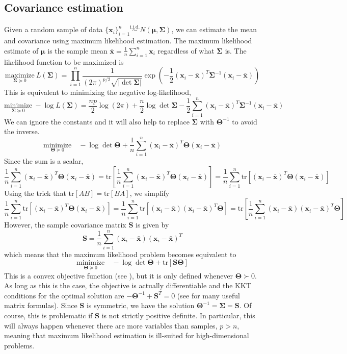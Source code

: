 \documentclass[10pt, letterpaper]{article}
\newcommand{\bx}{\boldsymbol x} %
\newcommand{\cov}{\boldsymbol \Sigma}
\newcommand{\preci}{\boldsymbol \Theta}
\newcommand{\mean}{\boldsymbol \mu}
\newcommand{\iid}{\stackrel{\mathrm{i.i.d.}}{\sim}}
\newcommand{\tr}[1]{\mathrm{tr}\left[  #1 \right]}
\newcommand{\sampcov}{\boldsymbol S} %
\begin{document}
\subsection{Covariance estimation}

Given a random sample of data $\{ \bx_i \}_{i=1}^n \iid N(\mean, \cov)$, we can estimate the mean and covariance using maximum likelihood estimation.  The maximum likelihood estimate of $\mean$ is the sample mean $\bar{\bx} = \frac{1}{n}\sum_{i=1}^n \bx_i$ regardless of what $\cov$ is.  The likelihood function to be maximized is
\[
\underset{\cov \succeq 0}{\mathrm{maximize}}\  L(\cov) = \prod_{i=1}^n \frac{1}{(2\pi)^{p/2} \sqrt{|\det \cov| }} \exp\left( -\frac{1}{2}(\bx_i - \bar{\bx})^T \cov^{-1}(\bx_i - \bar{\bx})  \right)
\]
This is equivalent to minimizing the negative log-likelihood,
\[
\underset{\cov \succeq 0}{\mathrm{minimize}}\  - \log L(\cov) = \frac{np}{2} \log(2\pi) + \frac{n}{2} \log \det \cov - \frac{1}{2} \sum_{i=1}^n (\bx_i - \bar{\bx})^T \cov^{-1}(\bx_i - \bar{\bx})
\]
We can ignore the constants and it will also help to replace $\cov$ with $\preci^{-1}$ to avoid the inverse.
\[
\underset{\preci \succeq 0}{\mathrm{minimize}}\quad   -\log \det \preci +  \frac{1}{n}\sum_{i=1}^n (\bx_i - \bar{\bx})^T \preci (\bx_i - \bar{\bx})
\]
Since the sum is a scalar,
\[
\frac{1}{n}\sum_{i=1}^n (\bx_i - \bar{\bx})^T \preci (\bx_i - \bar{\bx}) = \tr{\frac{1}{n}\sum_{i=1}^n (\bx_i - \bar{\bx})^T \preci (\bx_i - \bar{\bx})} = \frac{1}{n}\sum_{i=1}^n \tr{  (\bx_i - \bar{\bx})^T \preci (\bx_i - \bar{\bx})}
\]
Using the trick that $\tr{AB} = \tr{BA}$, we simplify
\[
\frac{1}{n}\sum_{i=1}^n \tr{  (\bx_i - \bar{\bx})^T \preci (\bx_i - \bar{\bx})} = \frac{1}{n}\sum_{i=1}^n \tr{  (\bx_i - \bar{\bx})(\bx_i - \bar{\bx})^T \preci } = \tr{\frac{1}{n}\sum_{i=1}^n (\bx_i - \bar{\bx})(\bx_i - \bar{\bx})^T \preci  }
\]
However, the sample covariance matrix $\sampcov$ is given by
\[
\sampcov =  \frac{1}{n}\sum_{i=1}^n (\bx_i - \bar{\bx})(\bx_i - \bar{\bx})^T
\]
which means that the maximum likelihood problem becomes equivalent to
\begin{equation}
\underset{\preci \succeq 0}{\mathrm{minimize}}\quad   -\log \det \preci + \tr{\sampcov \preci}
\label{eq:cov_mle}
\end{equation}
This is a convex objective function (see \cite{BV}), but it is only defined whenever $\preci \succ 0$.  As long as this is the case, the objective is actually differentiable and the KKT conditions for the optimal solution are $-\preci^{-1} + \sampcov^T = 0$ (see \cite{matrixcookbook} for many useful matrix formulas).  Since $\sampcov$ is symmetric, we have the solution $\preci^{-1} = \cov = \sampcov$.  Of course, this is problematic if $\sampcov$ is not strictly positive definite.  In particular, this will always happen whenever there are more variables than samples, $p > n$, meaning that maximum likelihood estimation is ill-suited for high-dimensional problems.
\end{document}
